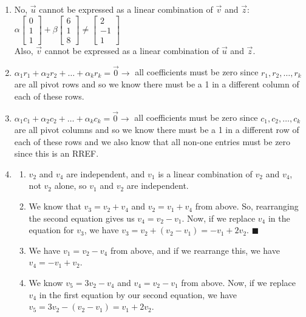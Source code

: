 \documentclass{article}
\newcommand*{\qed}{\hfill\ensuremath{\blacksquare}}
\begin{document}
\begin{enumerate}
\item No, $\overrightarrow{u}$ cannot be expressed as a linear combination of $\overrightarrow{v}$ and $\overrightarrow{z}$:\\ $\alpha
\begin{bmatrix}
	0\\
	1\\
	1
\end{bmatrix}
+\beta
\begin{bmatrix}
	6\\
	1\\
	8
\end{bmatrix}
\neq
\begin{bmatrix}
	2\\
	-1\\
	1
\end{bmatrix}
$\\
Also, $\overrightarrow{v}$ cannot be expressed as a linear combination of $\overrightarrow{u}$ and $\overrightarrow{z}$. 

\item $\alpha_1 r_1 + \alpha_2 r_2 + \dots + \alpha_k r_k = \overrightarrow{0} \rightarrow$ all coefficients must be zero since $r_1, r_2, \dots, r_k$ are all pivot rows and so we know there must be a 1 in a different column of each of these rows. 

\item $\alpha_1 c_1 + \alpha_2 c_2 + \dots + \alpha_k c_k = \overrightarrow{0} \rightarrow$ all coefficients must be zero since $c_1, c_2, \dots, c_k$ are all pivot columns and so we know there must be a 1 in a different row of each of these rows and we also know that all non-one entries must be zero since this is an RREF. 

\item 
\begin{enumerate}
	\item $v_2$ and $v_4$ are independent, and $v_1$ is a linear combination of $v_2$ and $v_4$, not $v_2$ alone, so $v_1$ and $v_2$ are independent. 
	\item We know that $v_3 = v_2 + v_4$ and $v_2 = v_1 + v_4$ from above. So, rearranging the second equation gives us $v_4 = v_2 - v_1$. Now, if we replace $v_4$ in the equation for $v_3$, we have $v_3 = v_2 + (v_2 - v_1) = -v_1 + 2v_2$. \qed
	\item We have $v_1 = v_2 - v_4$ from above, and if we rearrange this, we have $v_4 = -v_1+ v_2$. 
	\item We know $v_5 = 3v_2 - v_4$ and $v_4 = v_2 - v_1$ from above. Now, if we replace $v_4$ in the first equation by our second equation, we have $v_5 = 3v_2 - (v_2 - v_1) = v_1 + 2v_2$. 
\end{enumerate}


\end{enumerate}
\end{document}

